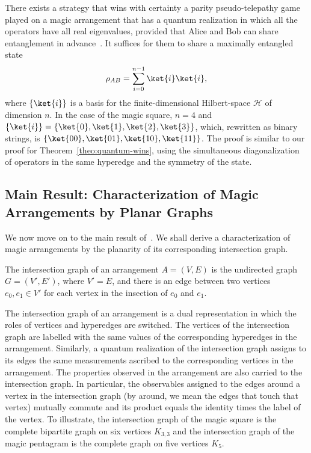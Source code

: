 \documentclass{llncs}
\begin{document}
There exists a strategy that wins with certainty a parity pseudo-telepathy
game played on a magic arrangement that has a quantum realization in
which all the operators have all real eigenvalues, provided that Alice
and Bob can share entanglement in advance~\cite[Theorem
17]{arkhipov:2012}. It suffices for them to share a maximally entangled
state
\[
  \rho_{AB} = \sum_{i = 0}^{n-1} \ket{i}\ket{i},
\]
where \(\{\ket{i}\}\) is a basis for the finite-dimensional
Hilbert-space \(\mathcal{H}\) of dimension \(n\). In the case of the
magic square, \(n = 4\) and
\(\{\ket{i}\} = \{\ket{0}, \ket{1}, \ket{2}, \ket{3}\}\), which,
rewritten as binary strings, is
\(\{\ket{00}, \ket{01}, \ket{10}, \ket{11}\}\). The proof is similar
to our proof for Theorem~\ref{theo:quantum-wins}, using the
simultaneous diagonalization of operators in the same hyperedge and
the symmetry of the state.

\subsection{Main Result: Characterization of Magic Arrangements by Planar Graphs}

We now move on to the main result of~\cite{arkhipov:2012}. We shall
derive a characterization of magic arrangements by the planarity of
its corresponding intersection graph.

\begin{definition}\label{def:intersec}
  The intersection graph of an arrangement \(A = (V, E)\) is the
  undirected graph \(G = (V', E')\), where \(V' = E\), and there is an
  edge between two vertices \(e_{0}, e_{1} \in V'\) for each vertex in
  the insection of \(e_{0}\) and \(e_{1}\).
\end{definition}

The intersection graph of an arrangement is a dual representation in
which the roles of vertices and hyperedges are switched. The vertices
of the intersection graph are labelled with the same values of the
corresponding hyperedges in the arrangement. Similarly, a quantum
realization of the intersection graph assigns to its edges the same
measurements ascribed to the corresponding vertices in the
arrangement. The properties observed in the arrangement are also
carried to the intersection graph. In particular, the observables
assigned to the edges around a vertex in the intersection graph (by
around, we mean the edges that touch that vertex) mutually commute and
its product equals the identity times the label of the vertex. To
illustrate, the intersection graph of the magic square is the complete
bipartite graph on six vertices \(K_{3, 3}\) and the intersection
graph of the magic pentagram is the complete graph on five vertices
\(K_{5}\).
\end{document}
